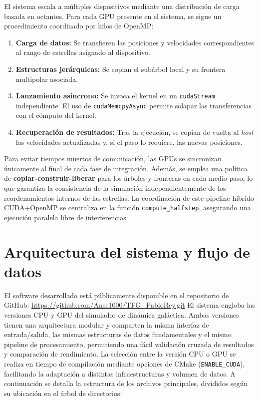 El sistema escala a múltiples dispositivos mediante una distribución de carga basada en octantes.
Para cada GPU presente en el sistema, se sigue un procedimiento coordinado por hilos de OpenMP:

\begin{enumerate}
    \item \textbf{Carga de datos:} Se transfieren las posiciones y velocidades correspondientes al rango de estrellas asignado al dispositivo.
    \item \textbf{Estructuras jerárquicas:} Se copian el subárbol local y su frontera multipolar asociada.
    \item \textbf{Lanzamiento asíncrono:} Se invoca el kernel en un \texttt{cudaStream} independiente. El uso de \texttt{cudaMemcpyAsync} permite solapar las transferencias con el cómputo del kernel.
    \item \textbf{Recuperación de resultados:} Tras la ejecución, se copian de vuelta al \textit{host} las velocidades actualizadas y, si el paso lo requiere, las nuevas posiciones.
\end{enumerate}

Para evitar tiempos muertos de comunicación, las GPUs se sincronizan únicamente al final de cada fase de integración.
Además, se emplea una política de \textbf{copiar-construir-liberar} para los árboles y fronteras en cada medio paso, lo que garantiza la consistencia de la simulación independientemente de los reordenamientos internos de las estrellas. La coordinación de este pipeline híbrido CUDA+OpenMP se centraliza en la función \texttt{compute\_halfstep}, asegurando una ejecución paralela libre de interferencias.

\section{Arquitectura del sistema y flujo de datos}\label{sec:arquitectura}
El software desarrollado está públicamente disponible en el repositorio de GitHub: \url{https://github.com/Anse1000/TFG_PabloRey.git}
El sistema engloba las versiones CPU y GPU del simulador de dinámica galáctica.
Ambas versiones tienen una arquitectura modular y comparten la misma interfaz de entrada/salida, las mismas estructuras de datos fundamentales y el mismo pipeline de procesamiento, permitiendo una fácil validación cruzada de resultados y comparación de rendimiento.
La selección entre la versión CPU o GPU se realiza en tiempo de compilación mediante opciones de CMake (\texttt{ENABLE\_CUDA}), facilitando la adaptación a distintas infraestructuras y volumen de datos.
A continuación se detalla la estructura de los archivos principales, divididos según su ubicación en el árbol de directorios:

